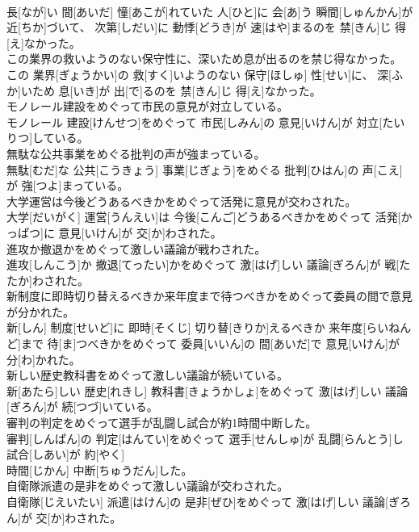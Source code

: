 \documentclass[8pt]{extreport}
\begin{document}
\begin{CJK}{UTF8}{min}
\\	長[なが]い 間[あいだ] 憧[あこが]れていた 人[ひと]に 会[あ]う 瞬間[しゅんかん]が 近[ちか]づいて、 次第[しだい]に 動悸[どうき]が 速[はや]まるのを 禁[きん]じ 得[え]なかった。
\\	この業界の救いようのない保守性に、深いため息が出るのを禁じ得なかった。	
\\	この 業界[ぎょうかい]の 救[すく]いようのない 保守[ほしゅ] 性[せい]に、 深[ふか]いため 息[いき]が 出[で]るのを 禁[きん]じ 得[え]なかった。
\\	モノレール建設をめぐって市民の意見が対立している。	
\\	モノレール 建設[けんせつ]をめぐって 市民[しみん]の 意見[いけん]が 対立[たいりつ]している。
\\	無駄な公共事業をめぐる批判の声が強まっている。	
\\	無駄[むだ]な 公共[こうきょう] 事業[じぎょう]をめぐる 批判[ひはん]の 声[こえ]が 強[つよ]まっている。
\\	大学運営は今後どうあるべきかをめぐって活発に意見が交わされた。	
\\	大学[だいがく] 運営[うんえい]は 今後[こんご]どうあるべきかをめぐって 活発[かっぱつ]に 意見[いけん]が 交[か]わされた。
\\	進攻か撤退かをめぐって激しい議論が戦わされた。	
\\	進攻[しんこう]か 撤退[てったい]かをめぐって 激[はげ]しい 議論[ぎろん]が 戦[たたか]わされた。
\\	新制度に即時切り替えるべきか来年度まで待つべきかをめぐって委員の間で意見が分かれた。	
\\	新[しん] 制度[せいど]に 即時[そくじ] 切り替[きりか]えるべきか 来年度[らいねんど]まで 待[ま]つべきかをめぐって 委員[いいん]の 間[あいだ]で 意見[いけん]が 分[わ]かれた。
\\	新しい歴史教科書をめぐって激しい議論が続いている。	
\\	新[あたら]しい 歴史[れきし] 教科書[きょうかしょ]をめぐって 激[はげ]しい 議論[ぎろん]が 続[つづ]いている。
\\	審判の判定をめぐって選手が乱闘し試合が約1時間中断した。	
\\	審判[しんぱん]の 判定[はんてい]をめぐって 選手[せんしゅ]が 乱闘[らんとう]し 試合[しあい]が 約[やく] 
\\	時間[じかん] 中断[ちゅうだん]した。
\\	自衛隊派遣の是非をめぐって激しい議論が交わされた。	
\\	自衛隊[じえいたい] 派遣[はけん]の 是非[ぜひ]をめぐって 激[はげ]しい 議論[ぎろん]が 交[か]わされた。

\end{CJK}
\end{document}
